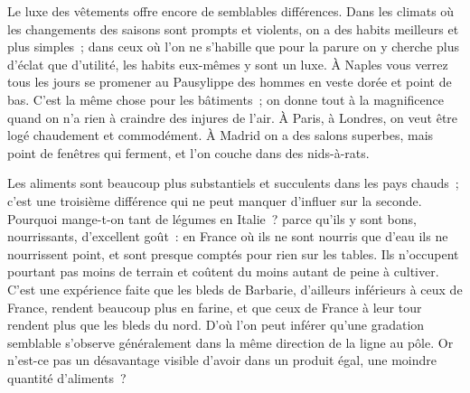 \documentclass[french,twoside]{book} %
\begin{document}
Le luxe des vêtements offre encore de semblables différences. Dans les climats où les changements des saisons sont prompts et violents, on a des habits meilleurs et plus simples ; dans ceux où l’on ne s’habille que pour la parure on y cherche plus d’éclat que d’utilité, les habits eux-mêmes y sont un luxe. À Naples vous verrez tous les jours se promener au Pausylippe des hommes en veste dorée et point de bas. C’est la même chose pour les bâtiments ; on donne tout à la magnificence quand on n’a rien à craindre des injures de l’air. À Paris, à Londres, on veut être logé chaudement et commodément. À Madrid on a des salons superbes, mais point de fenêtres qui ferment, et l’on couche dans des nids-à-rats.\par
Les aliments sont beaucoup plus substantiels et succulents dans les pays chauds ; c’est une troisième différence qui ne peut manquer d’influer sur la seconde. Pourquoi mange-t-on tant de légumes en Italie ? parce qu’ils y sont bons, nourrissants, d’excellent goût : en France où ils ne sont nourris que d’eau ils ne nourrissent point, et sont presque comptés pour rien sur les tables. Ils n’occupent pourtant pas moins de terrain et coûtent du moins autant de peine à cultiver. C’est une expérience faite que les bleds de Barbarie, d’ailleurs inférieurs à ceux de France, rendent beaucoup plus en farine, et que ceux de France à leur tour rendent plus que les bleds du nord. D’où l’on peut inférer qu’une gradation semblable s’observe généralement dans la même direction de la ligne au pôle. Or n’est-ce pas un désavantage visible d’avoir dans un produit égal, une moindre quantité d’aliments ?\par
\end{document}
